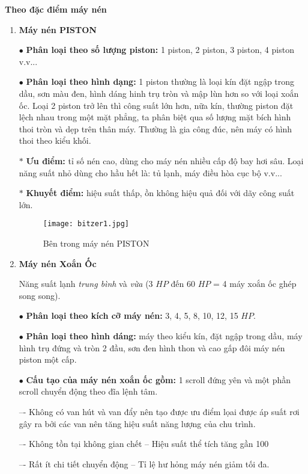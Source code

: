 	\textbf{Theo đặc điểm máy nén}
	\begin{enumerate}
		\setlength\itemsep{1mm}
		\item \textbf{Máy nén PISTON}
		
		$ \bullet $ \textbf{Phân loại theo số lượng piston:} 1 piston, 2 piston, 3 piston, 4 piston v.v...
		
		$ \bullet $ \textbf{Phân loại theo hình dạng:} 1 piston thường là loại kín đặt ngập trong dầu, sơn màu đen, hình dáng hinh trụ tròn và mập lùn hơn so với loại xoắn ốc. Loại 2 piston trở lên thì công suất lớn hơn, nữa kín, thường piston đặt lệch nhau trong một mặt phẳng, ta phân biệt qua số lượng mặt bích hình thoi tròn và dẹp trên thân máy. Thường là gia công đúc, nên máy có hình thoi theo kiểu khối.
		
		$ \ast $ \textbf{Ưu điểm:} tỉ số nén cao, dùng cho máy nén nhiều cấp độ bay hơi sâu. Loại năng suất nhỏ dùng cho hầu hết là: tủ lạnh, máy điều hòa cục bộ v.v...
		
		$ \ast $ \textbf{Khuyết điểm:} hiệu suất thấp, ồn không hiệu quả đối với dãy công suất lớn.
		
\begin{figure}[H]
	\centering
	\texttt{[image: bitzer1.jpg]}
	\caption{Bên trong máy nén PISTON}
\end{figure}		
		
		\item \textbf{Máy nén Xoắn Ốc} 
		
		Năng suất lạnh \textit{trung bình} và \textit{vừa} (3 $ HP $ đến 60 $ HP $ = 4 máy xoắn ốc ghép song song).
		
		$ \bullet $ \textbf{Phân loại theo kích cỡ máy nén:} 3, 4, 5, 8, 10, 12, 15 $ HP $.
		
		$ \bullet $ \textbf{Phân loại theo hình dáng:} máy theo kiểu kín, đặt ngập trong dầu, máy hình trụ đứng và tròn 2 đầu, sơn đen hình thon và cao gấp đôi máy nén piston một cấp.
		
		$ \bullet $ \textbf{Cấu tạo của máy nén xoắn ốc gồm:} 1 scroll đứng yên và một phần scroll chuyển động theo đĩa lệnh tâm.
		
		–- Không có van hút và van đẩy nên tạo được ưu điểm lọai được áp suất rơi gây ra bởi các van nên tăng hiệu suất năng lượng của chu trình.
		
		–- Không tồn tại không gian chết – Hiệu suất thể tích tăng gần 100%
		
		–- Rất ít chi tiết chuyển động – Tỉ lệ hư hỏng máy nén giảm tối đa.
		

\end{enumerate}
